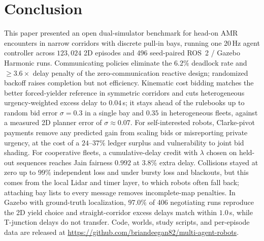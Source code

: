 \section{Conclusion}\label{sec:conc}
This paper presented an open dual-simulator benchmark for head-on AMR encounters in narrow corridors with discrete pull-in bays, running one 20\,Hz agent controller across $123{,}024$ 2D episodes and 496 seed-paired ROS~2 / Gazebo Harmonic runs. Communicating policies eliminate the $6.2\%$ deadlock rate and $\ge 3.6\times$ delay penalty of the zero-communication reactive design; randomized backoff raises completion but not efficiency. Kinematic cost bidding matches the better forced-yielder reference in symmetric corridors and cuts heterogeneous urgency-weighted excess delay to $0.04$\,s; it stays ahead of the rulebooks up to random bid error $\sigma=0.3$ in a single bay and $0.35$ in heterogeneous fleets, against a measured 2D planner error of $\sigma\approx0.07$. For self-interested robots, Clarke-pivot payments remove any predicted gain from scaling bids or misreporting private urgency, at the cost of a $24$--$37\%$ ledger surplus and vulnerability to joint bid shading. For cooperative fleets, a cumulative-delay credit with $\lambda$ chosen on held-out sequences reaches Jain fairness $0.992$ at $3.8\%$ extra delay. Collisions stayed at zero up to $99\%$ independent loss and under bursty loss and blackouts, but this comes from the local Lidar and timer layer, to which robots often fall back; attaching bay lists to every message removes incomplete-map penalties. In Gazebo with ground-truth localization, $97.0\%$ of 406 negotiating runs reproduce the 2D yield choice and straight-corridor excess delays match within $1.0$\,s, while T-junction delays do not transfer. Code, worlds, study scripts, and per-episode data are released at \url{https://github.com/briandeegan82/multi-agent-robots}.